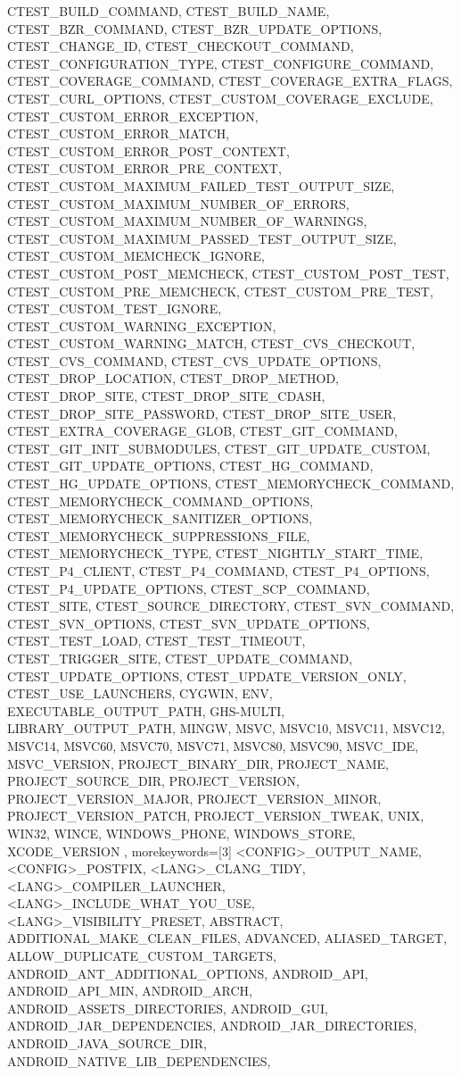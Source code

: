{{CTEST_BUILD_COMMAND,
CTEST_BUILD_NAME,
CTEST_BZR_COMMAND,
CTEST_BZR_UPDATE_OPTIONS,
CTEST_CHANGE_ID,
CTEST_CHECKOUT_COMMAND,
CTEST_CONFIGURATION_TYPE,
CTEST_CONFIGURE_COMMAND,
CTEST_COVERAGE_COMMAND,
CTEST_COVERAGE_EXTRA_FLAGS,
CTEST_CURL_OPTIONS,
CTEST_CUSTOM_COVERAGE_EXCLUDE,
CTEST_CUSTOM_ERROR_EXCEPTION,
CTEST_CUSTOM_ERROR_MATCH,
CTEST_CUSTOM_ERROR_POST_CONTEXT,
CTEST_CUSTOM_ERROR_PRE_CONTEXT,
CTEST_CUSTOM_MAXIMUM_FAILED_TEST_OUTPUT_SIZE,
CTEST_CUSTOM_MAXIMUM_NUMBER_OF_ERRORS,
CTEST_CUSTOM_MAXIMUM_NUMBER_OF_WARNINGS,
CTEST_CUSTOM_MAXIMUM_PASSED_TEST_OUTPUT_SIZE,
CTEST_CUSTOM_MEMCHECK_IGNORE,
CTEST_CUSTOM_POST_MEMCHECK,
CTEST_CUSTOM_POST_TEST,
CTEST_CUSTOM_PRE_MEMCHECK,
CTEST_CUSTOM_PRE_TEST,
CTEST_CUSTOM_TEST_IGNORE,
CTEST_CUSTOM_WARNING_EXCEPTION,
CTEST_CUSTOM_WARNING_MATCH,
CTEST_CVS_CHECKOUT,
CTEST_CVS_COMMAND,
CTEST_CVS_UPDATE_OPTIONS,
CTEST_DROP_LOCATION,
CTEST_DROP_METHOD,
CTEST_DROP_SITE,
CTEST_DROP_SITE_CDASH,
CTEST_DROP_SITE_PASSWORD,
CTEST_DROP_SITE_USER,
CTEST_EXTRA_COVERAGE_GLOB,
CTEST_GIT_COMMAND,
CTEST_GIT_INIT_SUBMODULES,
CTEST_GIT_UPDATE_CUSTOM,
CTEST_GIT_UPDATE_OPTIONS,
CTEST_HG_COMMAND,
CTEST_HG_UPDATE_OPTIONS,
CTEST_MEMORYCHECK_COMMAND,
CTEST_MEMORYCHECK_COMMAND_OPTIONS,
CTEST_MEMORYCHECK_SANITIZER_OPTIONS,
CTEST_MEMORYCHECK_SUPPRESSIONS_FILE,
CTEST_MEMORYCHECK_TYPE,
CTEST_NIGHTLY_START_TIME,
CTEST_P4_CLIENT,
CTEST_P4_COMMAND,
CTEST_P4_OPTIONS,
CTEST_P4_UPDATE_OPTIONS,
CTEST_SCP_COMMAND,
CTEST_SITE,
CTEST_SOURCE_DIRECTORY,
CTEST_SVN_COMMAND,
CTEST_SVN_OPTIONS,
CTEST_SVN_UPDATE_OPTIONS,
CTEST_TEST_LOAD,
CTEST_TEST_TIMEOUT,
CTEST_TRIGGER_SITE,
CTEST_UPDATE_COMMAND,
CTEST_UPDATE_OPTIONS,
CTEST_UPDATE_VERSION_ONLY,
CTEST_USE_LAUNCHERS,
CYGWIN,
ENV,
EXECUTABLE_OUTPUT_PATH,
GHS-MULTI,
LIBRARY_OUTPUT_PATH,
MINGW,
MSVC,
MSVC10,
MSVC11,
MSVC12,
MSVC14,
MSVC60,
MSVC70,
MSVC71,
MSVC80,
MSVC90,
MSVC_IDE,
MSVC_VERSION,
PROJECT_BINARY_DIR,
PROJECT_NAME,
PROJECT_SOURCE_DIR,
PROJECT_VERSION,
PROJECT_VERSION_MAJOR,
PROJECT_VERSION_MINOR,
PROJECT_VERSION_PATCH,
PROJECT_VERSION_TWEAK,
UNIX,
WIN32,
WINCE,
WINDOWS_PHONE,
WINDOWS_STORE,
XCODE_VERSION
         },
         morekeywords=[3]{
<CONFIG>_OUTPUT_NAME,
<CONFIG>_POSTFIX,
<LANG>_CLANG_TIDY,
<LANG>_COMPILER_LAUNCHER,
<LANG>_INCLUDE_WHAT_YOU_USE,
<LANG>_VISIBILITY_PRESET,
ABSTRACT,
ADDITIONAL_MAKE_CLEAN_FILES,
ADVANCED,
ALIASED_TARGET,
ALLOW_DUPLICATE_CUSTOM_TARGETS,
ANDROID_ANT_ADDITIONAL_OPTIONS,
ANDROID_API,
ANDROID_API_MIN,
ANDROID_ARCH,
ANDROID_ASSETS_DIRECTORIES,
ANDROID_GUI,
ANDROID_JAR_DEPENDENCIES,
ANDROID_JAR_DIRECTORIES,
ANDROID_JAVA_SOURCE_DIR,
ANDROID_NATIVE_LIB_DEPENDENCIES,
}}
